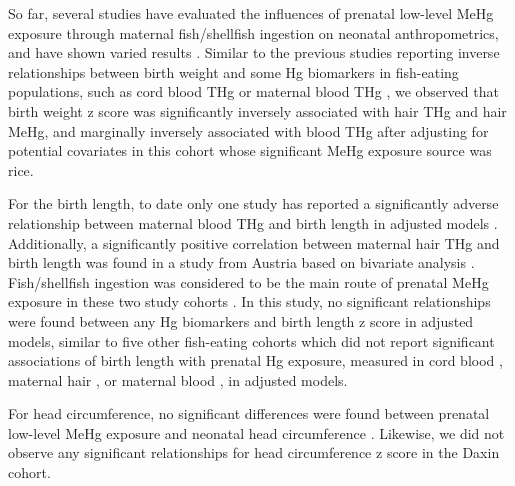 So far, several studies have evaluated the influences of prenatal low-level MeHg exposure through maternal fish/shellfish ingestion on neonatal anthropometrics, and have shown varied results \citep{daniels2007maternal,ramon2010fish,gundacker2010perinatal,lee2010interaction,ding2013prenatal,ou2015low,wells2016cord}. Similar to the previous studies reporting inverse relationships between birth weight and some Hg biomarkers in fish-eating populations, such as cord blood THg \citep{ramon2010fish,lee2010interaction} or maternal blood THg \citep{lee2010interaction,ou2015low}, we observed that birth weight z score was significantly inversely associated with hair THg and hair MeHg, and marginally inversely associated with blood THg after adjusting for potential covariates in this cohort whose significant MeHg exposure source was rice.

For the birth length, to date only one study has reported a significantly adverse relationship between maternal blood THg and birth length in adjusted models \citep{ou2015low}. Additionally, a significantly positive correlation between maternal hair THg and birth length was found in a study from Austria based on bivariate analysis \citep{gundacker2010perinatal}. Fish/shellfish ingestion was considered to be the main route of prenatal MeHg exposure in these two study cohorts \citep{gundacker2010perinatal,ou2015low}. In this study, no significant relationships were found between any Hg biomarkers and birth length z score in adjusted models, similar to five other fish-eating cohorts which did not report significant associations of birth length with prenatal Hg exposure, measured in cord blood \citep{lederman2008relation,ding2013prenatal,guo2013levels,wells2016cord}, maternal hair \citep{drouillet2010prenatal,guo2013levels}, or maternal blood \citep{lederman2008relation,ding2013prenatal}, in adjusted models. 

For head circumference, no significant differences were found between prenatal low-level MeHg exposure and neonatal head circumference \citep{lederman2008relation,drouillet2010prenatal,gundacker2010perinatal,ding2013prenatal,guo2013levels,wells2016cord}. Likewise, we did not observe any significant relationships for head circumference z score in the Daxin cohort.

